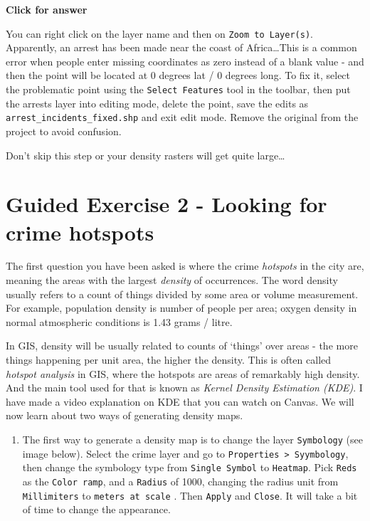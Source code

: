 \documentclass[
  letterpaper,
  DIV=11,
  numbers=noendperiod]{scrreprt}
\providecommand{\tightlist}{%
  \setlength{\itemsep}{0pt}\setlength{\parskip}{0pt}}\usepackage{longtable,booktabs,array}
\begin{document}
\begin{tcolorbox}[enhanced jigsaw, toprule=.15mm, breakable, left=2mm, colframe=quarto-callout-important-color-frame, colback=white, arc=.35mm, leftrule=.75mm, opacityback=0, rightrule=.15mm, bottomrule=.15mm]

\vspace{-3mm}\textbf{Click for answer}\vspace{3mm}

You can right click on the layer name and then on
\texttt{Zoom\ to\ Layer(s)}. Apparently, an arrest has been made near
the coast of Africa\ldots This is a common error when people enter
missing coordinates as zero instead of a blank value - and then the
point will be located at 0 degrees lat / 0 degrees long. To fix it,
select the problematic point using the \texttt{Select\ Features} tool in
the toolbar, then put the arrests layer into editing mode, delete the
point, save the edits as \texttt{arrest\_incidents\_fixed.shp} and exit
edit mode. Remove the original from the project to avoid confusion.

Don't skip this step or your density rasters will get quite
large\ldots{}

\end{tcolorbox}

\section{Guided Exercise 2 - Looking for crime
hotspots}\label{guided-exercise-2---looking-for-crime-hotspots}

The first question you have been asked is where the crime
\emph{hotspots} in the city are, meaning the areas with the largest
\emph{density} of occurrences. The word density usually refers to a
count of things divided by some area or volume measurement. For example,
population density is number of people per area; oxygen density in
normal atmospheric conditions is 1.43 grams / litre.

In GIS, density will be usually related to counts of `things' over areas
- the more things happening per unit area, the higher the density. This
is often called \emph{hotspot analysis} in GIS, where the hotspots are
areas of remarkably high density. And the main tool used for that is
known as \emph{Kernel Density Estimation (KDE)}. I have made a video
explanation on KDE that you can watch on Canvas. We will now learn about
two ways of generating density maps.

\begin{enumerate}
\def\labelenumi{(\arabic{enumi})}
\setcounter{enumi}{330}
\tightlist
\item
  The first way to generate a density map is to change the layer
  \texttt{Symbology} (see image below). Select the crime layer and go to
  \texttt{Properties\ \textgreater{}\ Syymbology}, then change the
  symbology type from \texttt{Single\ Symbol} to \texttt{Heatmap}. Pick
  \texttt{Reds} as the \texttt{Color\ ramp}, and a \texttt{Radius} of
  1000, changing the radius unit from \texttt{Millimiters} to
  \texttt{meters\ at\ scale} . Then \texttt{Apply} and \texttt{Close}.
  It will take a bit of time to change the appearance.
\end{enumerate}
\end{document}
